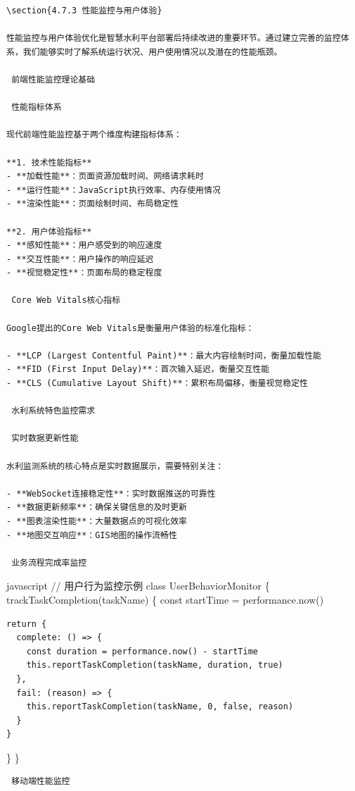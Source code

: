 {{\begin{lstlisting}
\section{4.7.3 性能监控与用户体验}

性能监控与用户体验优化是智慧水利平台部署后持续改进的重要环节。通过建立完善的监控体系，我们能够实时了解系统运行状况、用户使用情况以及潜在的性能瓶颈。

 前端性能监控理论基础

 性能指标体系

现代前端性能监控基于两个维度构建指标体系：

**1. 技术性能指标**
- **加载性能**：页面资源加载时间、网络请求耗时
- **运行性能**：JavaScript执行效率、内存使用情况
- **渲染性能**：页面绘制时间、布局稳定性

**2. 用户体验指标**
- **感知性能**：用户感受到的响应速度
- **交互性能**：用户操作的响应延迟
- **视觉稳定性**：页面布局的稳定程度

 Core Web Vitals核心指标

Google提出的Core Web Vitals是衡量用户体验的标准化指标：

- **LCP (Largest Contentful Paint)**：最大内容绘制时间，衡量加载性能
- **FID (First Input Delay)**：首次输入延迟，衡量交互性能  
- **CLS (Cumulative Layout Shift)**：累积布局偏移，衡量视觉稳定性

 水利系统特色监控需求

 实时数据更新性能

水利监测系统的核心特点是实时数据展示，需要特别关注：

- **WebSocket连接稳定性**：实时数据推送的可靠性
- **数据更新频率**：确保关键信息的及时更新
- **图表渲染性能**：大量数据点的可视化效率
- **地图交互响应**：GIS地图的操作流畅性

 业务流程完成率监控
\end{lstlisting}

javascript // 用户行为监控示例 class UserBehaviorMonitor \{ trackTaskCompletion(taskName) \{ const startTime = performance.now()

\begin{verbatim}
return {
  complete: () => {
    const duration = performance.now() - startTime
    this.reportTaskCompletion(taskName, duration, true)
  },
  fail: (reason) => {
    this.reportTaskCompletion(taskName, 0, false, reason)
  }
}
\end{verbatim}

\} \}

\begin{lstlisting}
 移动端性能监控


\end{lstlisting}}}
